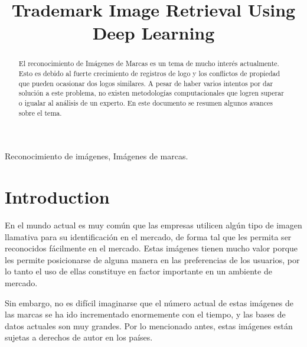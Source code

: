 \documentclass[conference]{IEEEtran}
\begin{document}
\title{Trademark Image Retrieval Using Deep Learning\\
}

\author{
\and
{}
}

\maketitle

\begin{abstract}
El reconocimiento de Imágenes de Marcas es un tema de mucho interés actualmente. Esto es debido al fuerte crecimiento de registros de logo y los conflictos de propiedad que pueden ocasionar dos logos similares. A pesar de haber varios intentos por dar solución a este problema, no existen metodologías computacionales que logren superar o igualar al análisis de un experto. En este documento se resumen algunos avances sobre el tema. 
\end{abstract}

\begin{IEEEkeywords}
Reconocimiento de imágenes, Imágenes de marcas.
\end{IEEEkeywords}

\section{Introduction}
En el mundo actual es muy común que las empresas utilicen algún tipo de imagen llamativa para su identificación en el mercado, de forma tal que les permita ser reconocidos fácilmente en el mercado. Estas imágenes tienen mucho valor porque les permite posicionarse de alguna manera en las preferencias de los usuarios, por lo tanto el uso de ellas constituye en factor importante en un ambiente de mercado.

Sin embargo, no es difícil imaginarse que el número actual de estas imágenes de las marcas se ha ido incrementado enormemente con el tiempo, y las bases de datos actuales son muy grandes. Por lo mencionado antes, estas imágenes están sujetas a derechos de autor en los países.
\end{document}
